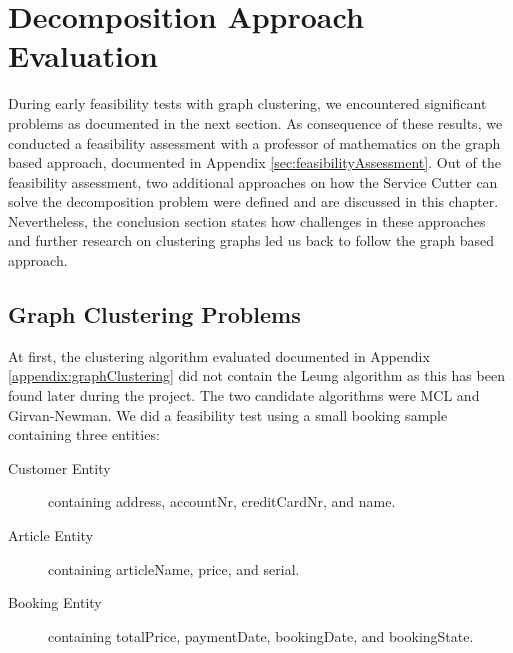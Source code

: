 \chapter{Decomposition Approach Evaluation}
\label{appendix:decompositionAppraoches}

During early feasibility tests with graph clustering, we encountered significant problems as documented in the next section. As consequence of these results, we conducted a feasibility assessment with a professor of mathematics on the graph based approach, documented in Appendix \ref{sec:feasibilityAssessment}. Out of the feasibility assessment, two additional approaches on how the Service Cutter can solve the decomposition problem were defined and are discussed in this chapter. Nevertheless, the conclusion section states how challenges in these approaches and further research on clustering graphs led us back to follow the graph based approach.

\section{Graph Clustering Problems}

At first, the clustering algorithm evaluated documented in Appendix \ref{appendix:graphClustering} did not contain the Leung algorithm as this has been found later during the project. The two candidate algorithms were MCL and Girvan-Newman. We did a feasibility test using a small booking sample containing three entities:

\begin{description}
	\item[Customer Entity] containing address, accountNr, creditCardNr, and name.
	\item[Article Entity] containing articleName, price, and serial.
	\item[Booking Entity] containing totalPrice, paymentDate, bookingDate, and bookingState.
\end{description}

